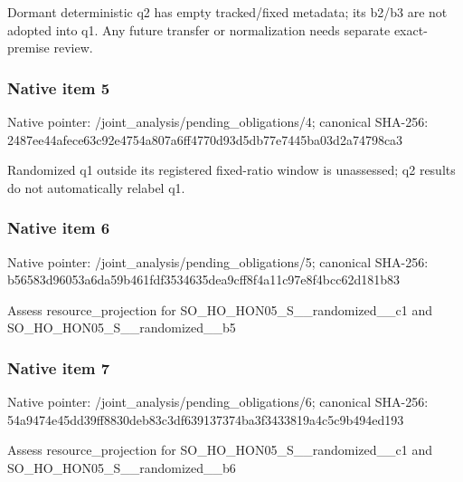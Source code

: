 \documentclass[10pt,a4paper]{article}
\begin{document}
\begingroup\raggedright\sloppy Dormant deterministic q2 has empty tracked/\allowbreak{}fixed metadata;\allowbreak{} its b2/\allowbreak{}b3 are not adopted into q1. Any future transfer or normalization needs separate exact-premise review.\par\endgroup

\subsubsection{Native item 5}
Native pointer: /joint\_\allowbreak{}analysis/pending\_\allowbreak{}obligations/4; canonical SHA-256: 2487ee44afece63c92e4754a807a6ff4770d93d5db77e7445ba03d2a74798ca3

\begingroup\raggedright\sloppy Randomized q1 outside its registered fixed-ratio window is unassessed;\allowbreak{} q2 results do not automatically relabel q1.\par\endgroup

\subsubsection{Native item 6}
Native pointer: /joint\_\allowbreak{}analysis/pending\_\allowbreak{}obligations/5; canonical SHA-256: b56583d96053a6da59b461fdf3534635dea9cff8f4a11c97e8f4bcc62d181b83

\begingroup\raggedright\sloppy Assess resource\_\allowbreak{}projection for SO\_\allowbreak{}HO\_\allowbreak{}HON05\_\allowbreak{}S\_\allowbreak{}\_\allowbreak{}randomized\_\allowbreak{}\_\allowbreak{}c1 and SO\_\allowbreak{}HO\_\allowbreak{}HON05\_\allowbreak{}S\_\allowbreak{}\_\allowbreak{}randomized\_\allowbreak{}\_\allowbreak{}b5\par\endgroup

\subsubsection{Native item 7}
Native pointer: /joint\_\allowbreak{}analysis/pending\_\allowbreak{}obligations/6; canonical SHA-256: 54a9474e45dd39ff8830deb83c3df639137374ba3f3433819a4c5c9b494ed193

\begingroup\raggedright\sloppy Assess resource\_\allowbreak{}projection for SO\_\allowbreak{}HO\_\allowbreak{}HON05\_\allowbreak{}S\_\allowbreak{}\_\allowbreak{}randomized\_\allowbreak{}\_\allowbreak{}c1 and SO\_\allowbreak{}HO\_\allowbreak{}HON05\_\allowbreak{}S\_\allowbreak{}\_\allowbreak{}randomized\_\allowbreak{}\_\allowbreak{}b6\par\endgroup
\end{document}
